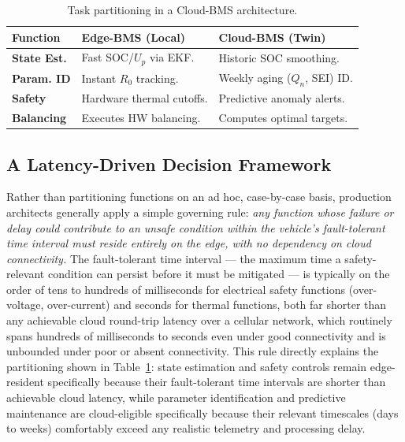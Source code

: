 \begin{table}[htbp]
\centering
\footnotesize
\caption{Task partitioning in a Cloud-BMS architecture.}
\label{tab:15_edge_vs_cloud}
\renewcommand{\arraystretch}{1.3}
\begin{tabular}{@{} l p{3cm} p{3.2cm} @{}}
\toprule
\textbf{Function} & \textbf{Edge-BMS (Local)} & \textbf{Cloud-BMS (Twin)} \\
\midrule
\textbf{State Est.} & Fast SOC/$U_p$ via EKF. & Historic SOC smoothing. \\
\textbf{Param. ID} & Instant $R_0$ tracking. & Weekly aging ($Q_n$, SEI) ID. \\
\textbf{Safety} & Hardware thermal cutoffs. & Predictive anomaly alerts. \\
\textbf{Balancing} & Executes HW balancing. & Computes optimal targets. \\
\bottomrule
\end{tabular}
\end{table}
\subsection{A Latency-Driven Decision Framework}
\label{subsec:15_latency_framework}

Rather than partitioning functions on an ad hoc, case-by-case basis, production architects generally apply a simple governing rule: \emph{any function whose failure or delay could contribute to an unsafe condition within the vehicle's fault-tolerant time interval must reside entirely on the edge, with no dependency on cloud connectivity.} The fault-tolerant time interval — the maximum time a safety-relevant condition can persist before it must be mitigated — is typically on the order of tens to hundreds of milliseconds for electrical safety functions (over-voltage, over-current) and seconds for thermal functions, both far shorter than any achievable cloud round-trip latency over a cellular network, which routinely spans hundreds of milliseconds to seconds even under good connectivity and is unbounded under poor or absent connectivity. This rule directly explains the partitioning shown in Table~\ref{tab:15_edge_vs_cloud}: state estimation and safety controls remain edge-resident specifically because their fault-tolerant time intervals are shorter than achievable cloud latency, while parameter identification and predictive maintenance are cloud-eligible specifically because their relevant timescales (days to weeks) comfortably exceed any realistic telemetry and processing delay.

